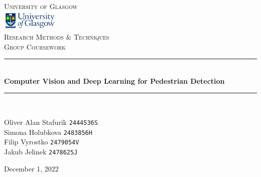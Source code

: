 \documentclass[11pt,a4paper]{article}
\begin{document}
\begin{titlepage} %
    \begin{center}	
    \newcommand{\HRule}{\rule{\linewidth}{0.5mm}} %
	
	\textsc{\LARGE University of Glasgow}\\[1.5cm] %
	\includegraphics[width=0.2\textwidth]{University-of-Glasgow-1024x374.png}\\[1cm] %
	\vfill\vfill
	\textsc{\Large Research Methods \& Techniques}\\[0.5cm] %
	
	\textsc{\large Group Coursework}\\[0.5cm] %
	
	\vfill\vfill\vfill
	\HRule\\[0.4cm]
	
	{\huge\bfseries Computer Vision and Deep Learning for Pedestrian Detection}\\[0.4cm] %
	
	\HRule\\[1.5cm]
	
	\vfill\vfill
	\begin{minipage}{0.4\textwidth}
		\begin{flushleft}
			\large
            Oliver Alan Stafurik \hfill \texttt{2444536S} \\
            Simona Holubkova \hfill \texttt{2483856H} \\
            Filip Vyrostko \hfill \texttt{2479054V} \\ 
            Jakub Jelinek \hfill \texttt{2478625J}
		\end{flushleft}
	\end{minipage}
	
	\vfill\vfill\vfill %
   
     {\large December 1, 2022} %
	\end{center} %
\end{titlepage}  
\end{document}
